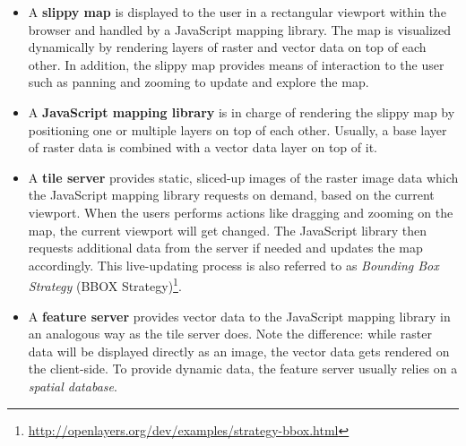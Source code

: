 \begin{itemize}

\item A \textbf{slippy map} is displayed to the user in a rectangular viewport within the browser and handled by a JavaScript mapping library. The map is visualized dynamically by rendering layers of raster and vector data on top of each other. In addition, the slippy map provides means of interaction to the user such as panning and zooming to update and explore the map. 

\item A \textbf{JavaScript mapping library} is in charge of rendering the slippy map by positioning one or multiple layers on top of each other. Usually, a base layer of raster data is combined with a vector data layer on top of it.

\item A \textbf{tile server} provides static, sliced-up images of the raster image data which the JavaScript mapping library requests on demand, based on the current viewport. When the users performs actions like dragging and zooming on the map, the current viewport will get changed. The JavaScript library then requests additional data from the server if needed and updates the map accordingly. This live-updating process is also referred to as \textit{Bounding Box Strategy} (BBOX Strategy)\footnote{\url{http://openlayers.org/dev/examples/strategy-bbox.html}}.

\item A \textbf{feature server} provides vector data to the JavaScript mapping library in an analogous way as the tile server does. Note the difference: while raster data will be displayed directly as an image, the vector data gets rendered on the client-side. To provide dynamic data, the feature server usually relies on a \textit{spatial database}. 

\end{itemize}


\cite{Miler10webis}








